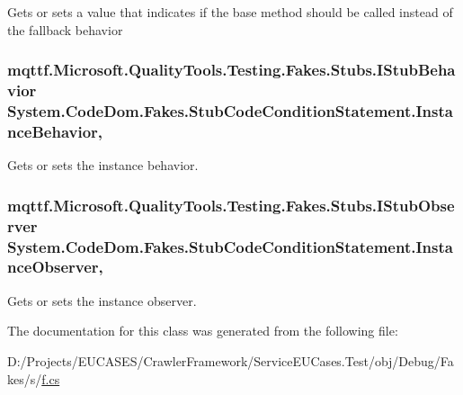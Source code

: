 Gets or sets a value that indicates if the base method should be called instead of the fallback behavior

\hypertarget{class_system_1_1_code_dom_1_1_fakes_1_1_stub_code_condition_statement_a530744f7d13f913b4fc7f23df96c3136}{
\subsubsection[{Instance\-Behavior}]{\setlength{\rightskip}{0pt plus 5cm}mqttf.\-Microsoft.\-Quality\-Tools.\-Testing.\-Fakes.\-Stubs.\-I\-Stub\-Behavior System.\-Code\-Dom.\-Fakes.\-Stub\-Code\-Condition\-Statement.\-Instance\-Behavior\hspace{0.3cm}{\ttfamily [get]}, {\ttfamily [set]}}}\label{class_system_1_1_code_dom_1_1_fakes_1_1_stub_code_condition_statement_a530744f7d13f913b4fc7f23df96c3136}


Gets or sets the instance behavior.

\hypertarget{class_system_1_1_code_dom_1_1_fakes_1_1_stub_code_condition_statement_a1dddd75903a624c2596f089653c872c4}{
\subsubsection[{Instance\-Observer}]{\setlength{\rightskip}{0pt plus 5cm}mqttf.\-Microsoft.\-Quality\-Tools.\-Testing.\-Fakes.\-Stubs.\-I\-Stub\-Observer System.\-Code\-Dom.\-Fakes.\-Stub\-Code\-Condition\-Statement.\-Instance\-Observer\hspace{0.3cm}{\ttfamily [get]}, {\ttfamily [set]}}}\label{class_system_1_1_code_dom_1_1_fakes_1_1_stub_code_condition_statement_a1dddd75903a624c2596f089653c872c4}


Gets or sets the instance observer.



The documentation for this class was generated from the following file\-:\begin{DoxyCompactItemize}
\item 
D\-:/\-Projects/\-E\-U\-C\-A\-S\-E\-S/\-Crawler\-Framework/\-Service\-E\-U\-Cases.\-Test/obj/\-Debug/\-Fakes/s/\hyperlink{s_2f_8cs}{f.\-cs}\end{DoxyCompactItemize}
